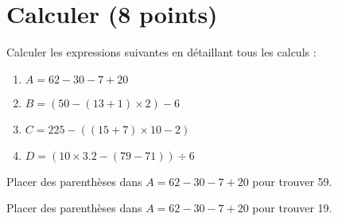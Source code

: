 \section{Calculer (8 points)}


\begin{questions}
	\question[4] Calculer les expressions suivantes en détaillant tous les calculs :
	
	\begin{enumerate}
		\item $A = 62 - 30 - 7 + 20$
		
		\item $B = (50 - (13 + 1) \times 2) - 6$
		
		\item $C= 225 - ((15 + 7) \times 10 - 2)$
		
		\item $D= (10 \times \num{3.2} - (79 - 71)) \div 6$
	\end{enumerate}

	\question[1] Placer des parenthèses dans $A = 62 - 30 - 7 + 20$ pour trouver 59.
	
	\question[1] Placer des parenthèses dans $A = 62 - 30 - 7 + 20$ pour trouver 19.
\end{questions}
